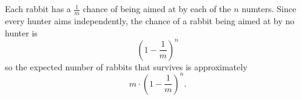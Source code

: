 \documentclass[12pt]{article}
\begin{document}
\section{}
\noindent{}\bigskip\par
Each rabbit has a $\frac{1}{m}$ chance of being aimed at by each of the $n$ numters. Since every hunter aims independently, the chance of a rabbit being aimed at by no hunter is
\[ \left( 1- \frac{1}{m} \right)^n \]
so the expected number of rabbits that survives is approximately
\[ m \cdot \left( 1- \frac{1}{m} \right)^n. \]
\end{document}
